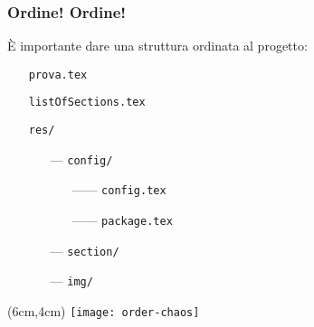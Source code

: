 \begin{frame}
 \frametitle{Ordine! Ordine!}
 
 È importante dare una struttura ordinata al progetto:
 
 \begin{itemize}
  \item[] \texttt{prova.tex}
  \item[] \texttt{listOfSections.tex}
  \item[] \texttt{res/}
  \begin{itemize}
    \item[---] \texttt{config/}
    \begin{itemize}
      \item[------] \texttt{config.tex}
      \item[------] \texttt{package.tex}
    \end{itemize}
    \item[---] \texttt{section/}
    \item[---] \texttt{img/}
  \end{itemize}
 \end{itemize}
 
 
 \begin{textblock*}{5cm}(6cm,4cm)
   \texttt{[image: order-chaos]}
 \end{textblock*}


\end{frame}
